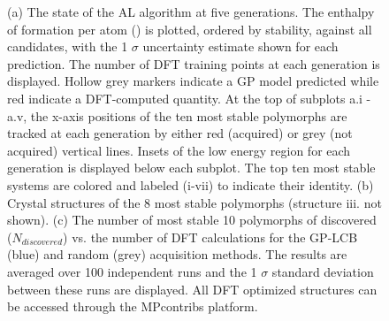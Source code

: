 \begin{figure}[!htb]
\centering
{}
\caption{\label{fig:iro3_al}
%
(a) The state of the AL algorithm at five generations.
%
The enthalpy of formation per atom (\DHf) is plotted, ordered by stability, against all \IrOthree candidates, with the 1 $\sigma$ uncertainty estimate shown for each prediction.
%
The number of DFT training points at each generation is displayed.
%
Hollow grey markers indicate a GP model predicted \DHf while red indicate a DFT-computed quantity.
%
At the top of subplots a.i - a.v, the x-axis positions of the ten most stable polymorphs are tracked at each generation by either red (acquired) or grey (not acquired) vertical lines.
%
Insets of the low energy region for each generation is displayed below each subplot.
%
The top ten most stable systems are colored and labeled (i-vii) to indicate their identity.
%
(b) Crystal structures of the \num{8} most stable \IrOthree polymorphs (structure iii. not shown).
%
%
(c) The number of most stable \num{10} polymorphs of \IrOthree discovered ($N_{discovered}$) vs. the number of DFT calculations for the GP-LCB (blue) and random (grey) acquisition methods.
%
The results are averaged over \num{100} independent runs and the 1 $\sigma$ standard deviation between these runs are displayed.
%
All \IrOx DFT optimized structures can be accessed through the MPcontribs platform.~\cite{upload_MPContribs}
}
\end{figure}



